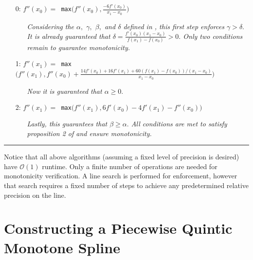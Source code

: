 \documentclass{article}
\begin{document}
\begin{itemize}
  \itemsep0pt
  \parskip0pt

\item[0:] $f''(x_0) = $\texttt{ max}$\bigg(f''(x_0), \frac{-6 f'(x_0)}{x_1 - x_0}\bigg)$

  \begin{itemize}
    \item[] \textit{Considering the $\alpha,$ $\gamma,$ $\beta,$ and $\delta$ defined in \cite{schmidt1988positivity}, this first step enforces $\gamma > \delta.$ It is already guaranteed that $\delta = \frac{f'(x_0)(x_1 - x_0)}{f(x_1) - f(x_0)} > 0.$ Only two conditions remain to guarantee monotonicity.}
  \end{itemize}

\item[1:] $f''(x_1) = $\texttt{ max}$\bigg( f''(x_1), f''(x_0) + \frac{14 f'(x_0) + 16 f'(x_1) + 60(f(x_1) - f(x_0)) / (x_1 - x_0)}{x_1 - x_0} \bigg)$

  \begin{itemize}
    \item[] \textit{Now it is guaranteed that $\alpha \geq 0.$}
  \end{itemize}

\item[2:] $f''(x_1) = $\texttt{ max}$\bigg( f''(x_1), 6 f'(x_0) - 4 f'(x_1) - f''(x_0) \bigg)$

  \begin{itemize}
    \item[] \textit{Lastly, this guarantees that $\beta \geq \alpha.$ All conditions are met to satisfy proposition 2 of \cite{schmidt1988positivity} and ensure monotonicity.}
  \end{itemize}
\end{itemize}
\hrule
\vspace{10pt}
Notice that all above algorithms (assuming a fixed level of precision is desired) have $\mathcal{O}(1)$ runtime. Only a finite number of operations are needed for monotonicity verification. A line search is performed for enforcement, however that search requires a fixed number of steps to achieve any predetermined relative precision on the line.


\section{Constructing a Piecewise Quintic Monotone Spline}
\label{monotone_spline}
\end{document}
